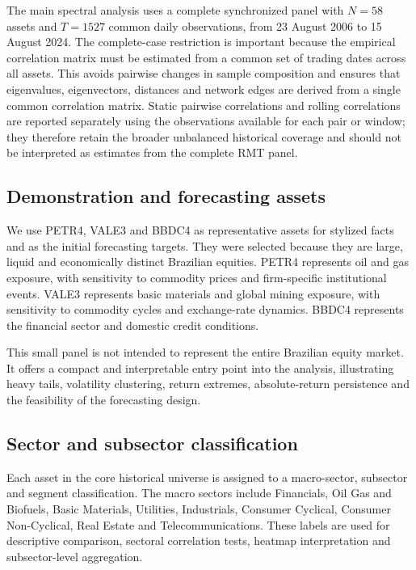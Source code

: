 The main spectral analysis uses a complete synchronized panel with $N=58$ assets and $T=1527$ common daily observations, from 23 August 2006 to 15 August 2024. The complete-case restriction is important because the empirical correlation matrix must be estimated from a common set of trading dates across all assets. This avoids pairwise changes in sample composition and ensures that eigenvalues, eigenvectors, distances and network edges are derived from a single common correlation matrix. Static pairwise correlations and rolling correlations are reported separately using the observations available for each pair or window; they therefore retain the broader unbalanced historical coverage and should not be interpreted as estimates from the complete RMT panel.

\subsection{Demonstration and forecasting assets}

We use PETR4, VALE3 and BBDC4 as representative assets for stylized facts and as the initial forecasting targets. They were selected because they are large, liquid and economically distinct Brazilian equities. PETR4 represents oil and gas exposure, with sensitivity to commodity prices and firm-specific institutional events. VALE3 represents basic materials and global mining exposure, with sensitivity to commodity cycles and exchange-rate dynamics. BBDC4 represents the financial sector and domestic credit conditions.

This small panel is not intended to represent the entire Brazilian equity market. It offers a compact and interpretable entry point into the analysis, illustrating heavy tails, volatility clustering, return extremes, absolute-return persistence and the feasibility of the forecasting design.

\subsection{Sector and subsector classification}

Each asset in the core historical universe is assigned to a macro-sector, subsector and segment classification. The macro sectors include Financials, Oil Gas and Biofuels, Basic Materials, Utilities, Industrials, Consumer Cyclical, Consumer Non-Cyclical, Real Estate and Telecommunications. These labels are used for descriptive comparison, sectoral correlation tests, heatmap interpretation and subsector-level aggregation.

